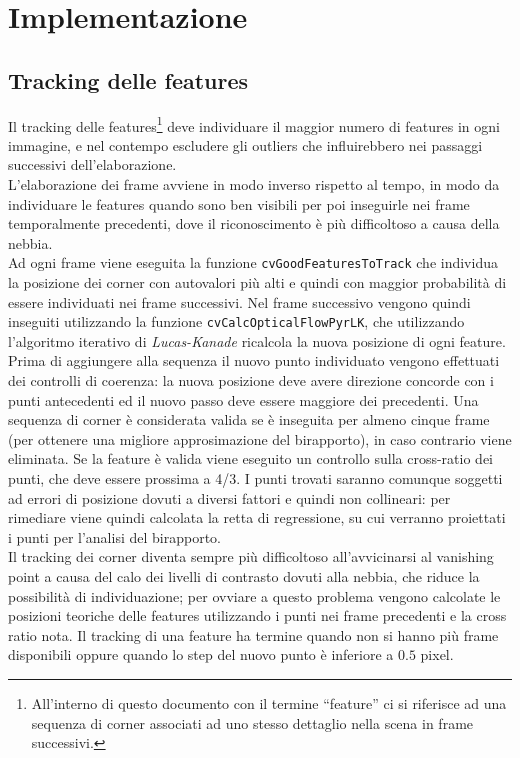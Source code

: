 \documentclass[12pt]{report}
\begin{document}
\chapter{Implementazione}

\section{Tracking delle features}


\noindent Il tracking delle features\footnote{All'interno di questo documento con il termine ``feature'' ci si riferisce ad una sequenza di corner associati ad uno stesso dettaglio nella scena in frame successivi.} deve individuare il maggior numero di features in ogni immagine, e nel contempo escludere gli outliers che influirebbero nei passaggi successivi dell'elaborazione.\\
L'elaborazione dei frame avviene in modo inverso rispetto al tempo, in modo da individuare le features quando sono ben visibili per poi inseguirle nei frame temporalmente precedenti, dove il riconoscimento \`e pi\`u difficoltoso a causa della nebbia.\\

\noindent Ad ogni frame viene eseguita la funzione \verb|cvGoodFeaturesToTrack| che individua la posizione dei corner con autovalori pi\`u alti e quindi con maggior probabilit\`a di essere individuati nei frame successivi. Nel frame successivo vengono quindi inseguiti utilizzando la funzione \verb|cvCalcOpticalFlowPyrLK|, che utilizzando l'algoritmo iterativo di \emph{Lucas-Kanade} ricalcola la nuova posizione di ogni feature.\\

\noindent Prima di aggiungere alla sequenza il nuovo punto individuato vengono effettuati dei controlli di coerenza: la nuova posizione deve avere direzione concorde con i punti antecedenti ed il nuovo passo deve essere maggiore dei precedenti. Una sequenza di corner \`e considerata valida se \`e inseguita per almeno cinque frame (per ottenere una migliore approsimazione del birapporto), in caso contrario viene eliminata. Se la feature \`e valida viene eseguito un controllo sulla cross-ratio dei punti, che deve essere prossima a 4/3. I punti trovati saranno comunque soggetti ad errori di posizione dovuti a diversi fattori e quindi non collineari: per rimediare viene quindi calcolata la retta di regressione, su cui verranno proiettati i punti per l'analisi del birapporto.\\

\noindent Il tracking dei corner diventa sempre pi\`u difficoltoso all'avvicinarsi al vanishing point a causa del calo dei livelli di contrasto dovuti alla nebbia, che riduce la possibilit\`a di individuazione; per ovviare a questo problema vengono calcolate le posizioni teoriche delle features utilizzando i punti nei frame precedenti e la cross ratio nota. Il tracking di una feature ha termine quando non si hanno pi\`u frame disponibili oppure quando lo step del nuovo punto \`e inferiore a $0.5$ pixel.
\end{document}
